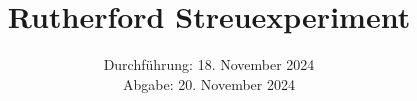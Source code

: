 

\subject{\texorpdfstring{\vspace{2ex}}{}V16\texorpdfstring{\vspace{-2ex}}{}} %
\title{Rutherford Streuexperiment} %
\date{
	Durchführung: 18. November 2024 %
	\\ Abgabe: 20. November 2024 %
}





\maketitle
\thispagestyle{empty}

\tableofcontents
\newpage








\printbibliography{}

%


